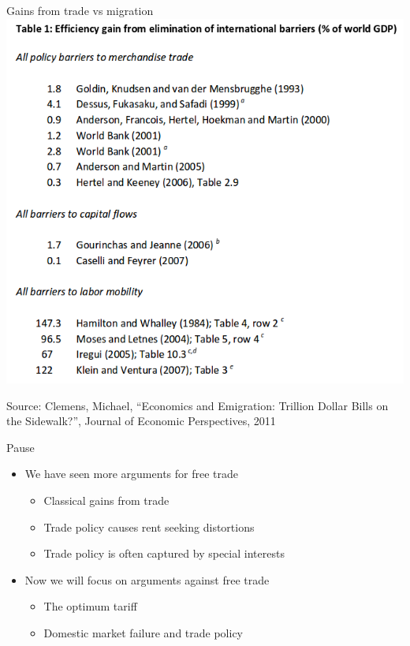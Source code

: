 \documentclass{beamer}
\begin{document}
\begin{frame}{Gains from trade vs migration}
    \includegraphics[scale=0.25]{gains_to_migration.png}

    {\tiny Source: Clemens, Michael, ``Economics and Emigration: Trillion Dollar Bills on the Sidewalk?'', Journal of Economic Perspectives, 2011}
\end{frame}

\begin{frame}{Pause}
    \begin{itemize}
        \item We have seen more arguments for free trade
        \begin{itemize}
            \item Classical gains from trade
            \item Trade policy causes rent seeking distortions
            \item Trade policy is often captured by special interests
        \end{itemize}
        \item Now we will focus on arguments against free trade
        \begin{itemize}
            \item The optimum tariff
            \item Domestic market failure and trade policy
        \end{itemize}
    \end{itemize}
\end{frame}
\end{document}
